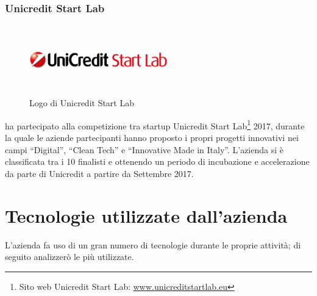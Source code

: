    \subsubsection{Unicredit Start Lab}
   \begin{figure}[H]
      \begin{center}
         \includegraphics[width=6cm,height=3cm,keepaspectratio]{immagini/unicreditstartlab-logo}
      \end{center}
      \caption{Logo di Unicredit Start Lab}\label{logounicreditstartlab}
   \end{figure}
   \nomeAzienda{} ha partecipato alla competizione tra startup Unicredit Start Lab\footnote{Sito web Unicredit Start Lab: \href{http://www.unicreditstartlab.eu}{www.unicreditstartlab.eu}} 2017, durante la quale le aziende partecipanti hanno proposto i propri progetti innovativi nei campi ``Digital'', ``Clean Tech'' e ``Innovative Made in Italy''. L'azienda si è classificata tra i 10 finalisti e ottenendo un periodo di incubazione e accelerazione da parte di Unicredit a partire da Settembre 2017.

\section{Tecnologie utilizzate dall'azienda}
L'azienda fa uso di un gran numero di tecnologie durante le proprie attività; di seguito analizzerò le più utilizzate.

